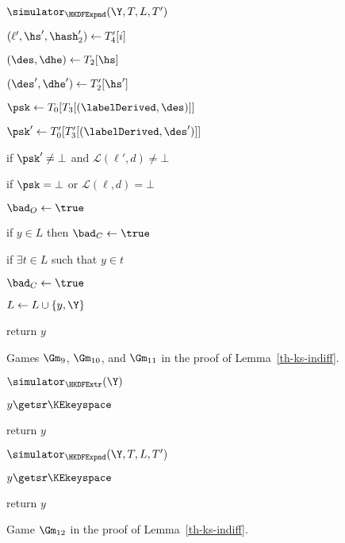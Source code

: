 \begin{figure}[tp]
\begin{minipage}[t]{0.49\textwidth}
\begin{oracle}{$\simulator_{\HKDFExpnd}(\Y, T, L, T')$}
	\item \quad $(\ell', \hs', \hash'_2) \gets T'_4[i]$
	\item \quad $(\des, \dhe) \gets T_2[\hs]$
	\item \quad $(\des', \dhe') \gets T'_2[\hs']$
	\item \quad $\psk \gets T_0[T_3[(\labelDerived, \des)]]$
	\item \quad $\psk' \gets T'_0[T'_3[(\labelDerived, \des')]]$
	\item \quad if $\psk' \neq \bot$ and $\mathcal{L}(\ell', d) \neq \bot$
	\item \quad \quad if $\psk = \bot$ or $\mathcal{L}(\ell, d) =\bot$
	\item \quad \quad \quad $\bad_O \gets \true$
	\item if $y \in L$ then $\bad_C \gets \true$
	\item if $\exists t \in L$ such that $y \in t$
	\item \quad $\bad_C \gets \true$
	\item $ L \gets L \cup \{y, \Y\}$
	\item return $y$
	\end{oracle}
	\end{minipage}
	\label{fig:gm910-ks-indiff}
	\caption{ Games $\Gm_9$, $\Gm_{10}$, and $\Gm_{11}$ in the proof of Lemma~\ref{th-ks-indiff}.}
\end{figure}
\begin{figure}[tp]
	\begin{minipage}[t]{0.48\textwidth}
		\NewExperiment[Game $\Gm_{12}$]
		
		\ExptSepSpace
			\begin{oracle}{$\simulator_{\HKDFExtr}(\Y)$}
			\item $y \getsr \KEkeyspace$
			\item return $y$
		\end{oracle}
	\end{minipage}
	
	\begin{minipage}[t]{0.49\textwidth}
		\ExptSepSpace
		\begin{oracle}{$\simulator_{\HKDFExpnd}(\Y, T, L, T')$}
			\item $y \getsr \KEkeyspace$
			\item return $y$
		\end{oracle}
\end{minipage}
\label{fig:gm12-ks-indiff}
\caption{Game $\Gm_{12}$ in the proof of Lemma~\ref{th-ks-indiff}.}
\end{figure}